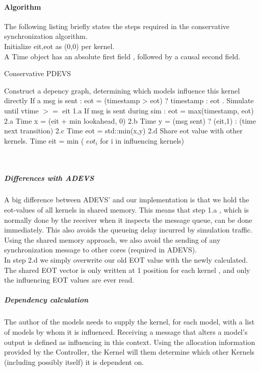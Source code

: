 \documentclass[8pt,a4paper]{report}
\begin{document}
\paragraph{Algorithm}
The following listing briefly states the steps required in the conservative synchronization algorithm.\\
Initialize eit,eot as (0,0) per kernel.\\
A Time object has an absolute first field , followed by a causal second field.\\
\begin{algorithm}
\caption{Conservative PDEVS}
\label{CHalgorithm}
\begin{algorithmic}
 Construct a depency graph, determining which models influence this kernel directly
 If a msg is sent : eot = (timestamp > eot) ? timestamp : eot
. Simulate until vtime $>=$ eit
\State 1.a If msg is sent during sim : eot = max(timestamp, eot)
\State 2.a Time x = (eit + min lookahead, 0)
\State 2.b Time y = (msg sent) ? (eit,1) : (time next transition)
\State 2.c Time eot = std::min(x,y)
\State 2.d Share eot value with other kernels.
   Time eit = min ( $eot_i$ for i in influencing kernels)
\EndWhile
\EndProcedure
\end{algorithmic}
\end{algorithm}\\
\subparagraph{Differences with ADEVS}
A big difference between ADEVS' and our implementation is that we hold the eot-values of all kernels in shared memory. This means that step 1.a , which is normally done by the receiver when it inspects the message queue, can be done immediately. This also avoids the queueing delay incurred by simulation traffic.\\
Using the shared memory approach, we also avoid the sending of any synchronization message to other cores (required in ADEVS). \\In step 2.d we simply overwrite our old EOT value with the newly calculated. The shared EOT vector is only written at 1 position for each kernel , and only the influencing EOT values are ever read. \\
\subparagraph{Dependency calculation}
The author of the models needs to supply the kernel, for each model, with a list of models by whom it is influenced. Receiving a message that alters a model's output is defined as influencing in this context. Using the allocation information provided by the Controller, the Kernel will them determine which other Kernels (including possibly itself) it is dependent on.\\
\end{document}
